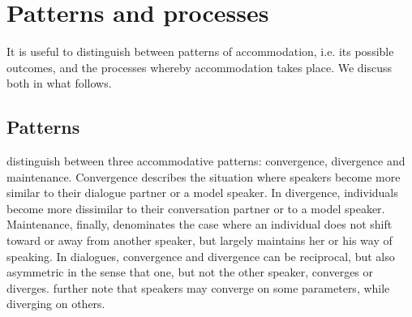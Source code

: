 \documentclass[output=paper,
modfonts
]{langscibook}
\begin{document}
\section{Patterns and processes}
% 
% 
% 
% 
% 
% 
It is useful to distinguish between patterns of accommodation, i.e. its possible outcomes, and the processes whereby accommodation takes place. We discuss both in what follows.
\subsection{Patterns}

\cite{giles_accommodation_1991} distinguish between three  accommodative patterns: convergence, divergence and maintenance. Convergence describes the situation where speakers become more similar to their dialogue partner or a model speaker. In divergence, individuals become more dissimilar to their conversation partner or to a model speaker. Maintenance, finally, denominates the case where an individual does not shift toward or away from another speaker, but largely maintains her or his way of speaking. In dialogues, convergence and divergence can be reciprocal, but also asymmetric in the sense that one, but not the other speaker, converges or diverges. \cite{giles_accommodation_1991} further note that speakers may converge on some parameters, while diverging on others.
% 
% 
% 
%  
% 
% 
% 
% 
\end{document}
